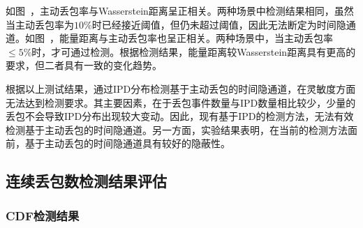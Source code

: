 如图\ ，主动丢包率与Wasserstein距离呈正相关。两种场景中检测结果相同，虽然当主动丢包率为$10\%$时已经接近阈值，但仍未超过阈值，因此无法断定为时间隐通道。如图\ ，能量距离与主动丢包率也呈正相关。两种场景中，当主动丢包率$\le 5\%$时，才可通过检测。根据检测结果，能量距离较Wasserstein距离具有更高的要求，但二者具有一致的变化趋势。

根据以上测试结果，通过IPD分布检测基于主动丢包的时间隐通道，在灵敏度方面无法达到检测要求。其主要因素，在于丢包事件数量与IPD数量相比较少，少量的丢包不会导致IPD分布出现较大变动。因此，现有基于IPD的检测方法，无法有效检测基于主动丢包的时间隐通道。另一方面，实验结果表明，在当前的检测方法面前，基于主动丢包的时间隐通道具有较好的隐蔽性。

\subsection{连续丢包数检测结果评估}
\label{chap:analyze:result:burst}

\subsubsection{CDF检测结果}
\label{chap:analyze:result:burst:cdf}


